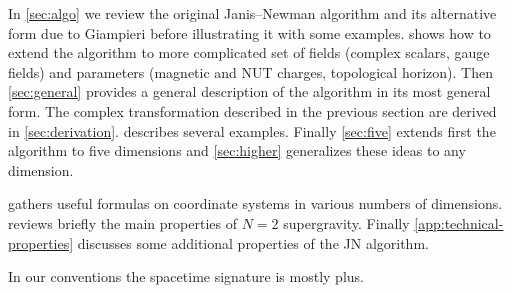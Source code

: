In \cref{sec:algo} we review the original Janis--Newman algorithm and its alternative form due to Giampieri before illustrating it with some examples.
 shows how to extend the algorithm to more complicated set of fields (complex scalars, gauge fields) and parameters (magnetic and NUT charges, topological horizon).
Then \cref{sec:general} provides a general description of the algorithm in its most general form.
The complex transformation described in the previous section are derived in \cref{sec:derivation}.
 describes several examples.
Finally \cref{sec:five} extends first the algorithm to five dimensions and \cref{sec:higher} generalizes these ideas to any dimension.

 gathers useful formulas on coordinate systems in various numbers of dimensions.
 reviews briefly the main properties of $N = 2$ supergravity.
Finally \cref{app:technical-properties} discusses some additional properties of the JN algorithm.

In our conventions the spacetime signature is mostly plus.
